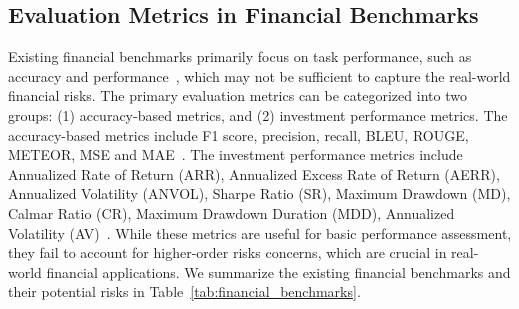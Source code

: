 \subsection{Evaluation Metrics in Financial Benchmarks}
Existing financial benchmarks primarily focus on task performance, such as accuracy and performance~\citep{xie2024pixiu,yuan-etal-2024-r,islam2023financebench}, which may not be sufficient to capture the real-world financial risks.
The primary evaluation metrics can be categorized into two groups: (1) accuracy-based metrics, and (2) investment performance metrics. The accuracy-based metrics include F1 score, precision, recall, BLEU, ROUGE, METEOR, MSE and MAE~\citep{zhang2024dolares,hirano-2024-construction,quan-liu-2024-econlogicqa,li2024alphafin}. 
The investment performance metrics include Annualized Rate of Return (ARR), Annualized Excess Rate of Return (AERR), Annualized Volatility (ANVOL), Sharpe Ratio (SR), Maximum Drawdown (MD), Calmar Ratio (CR), Maximum Drawdown Duration (MDD), Annualized Volatility (AV)~\citep{li2024investorbenchbenchmarkfinancialdecisionmaking,yu2024finconsynthesizedllmmultiagent,li2024alphafin}. 
While these metrics are useful for basic performance assessment, they fail to account for higher-order risks concerns, which are crucial in real-world financial applications. We summarize the existing financial benchmarks and their potential risks in Table~\ref{tab:financial_benchmarks}.





